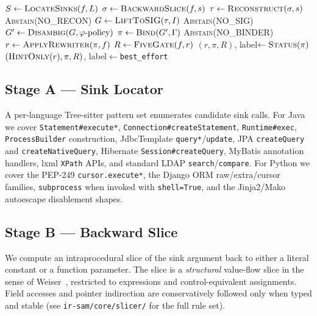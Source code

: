 \documentclass[conference]{IEEEtran}
\newcommand{\IRSAM}{\textsc{IR-SAM}}
\newcommand{\phisig}{\ensuremath{\varphi}}
\begin{document}
\begin{algorithm}[t]
\caption{\IRSAM{} top-level pipeline}\label{alg:pipeline}
\begin{algorithmic}[1]
  \State $S \gets \Call{LocateSinks}{f, L}$                      
    \State $\sigma \gets \Call{BackwardSlice}{f, s}$            
    \State $\tau \gets \Call{Reconstruct}{\sigma, s}$           
    \If{$\tau = \bot$} \State \Return \textsc{Abstain}(NO\_RECON)
    \EndIf
    \State $G \gets \Call{LiftToSIG}{\tau, I}$                  
     \State \Return \textsc{Abstain}(NO\_SIG)
    \EndIf
    \State $G' \gets \Call{Disambig}{G, \phisig\text{-policy}}$ 
    \State $\pi \gets \Call{Bind}{G', \Gamma}$                  
    \If{$\pi = \bot$} \State \Return \textsc{Abstain}(NO\_BINDER)
    \EndIf
    \State $r \gets \Call{ApplyRewriter}{\pi, f}$
    \State $R \gets \Call{FiveGate}{f, r}$                      
      \State \Return $(r, \pi, R)$, label$\gets\Call{Status}{\pi}$
    \Else
      \State \Return $(\textsc{HintOnly}(r), \pi, R)$, label$\gets$\texttt{best\_effort}
    \EndIf
  \EndFor
\EndFunction
\end{algorithmic}
\end{algorithm}

\subsection{Stage A --- Sink Locator}
A per-language Tree-sitter pattern set enumerates candidate sink
calls. For Java we cover \texttt{Statement\#execute*},
\texttt{Connection\#createStatement}, \texttt{Runtime\#exec},
\texttt{ProcessBuilder} construction, JdbcTemplate
\texttt{query*}/\texttt{update}, JPA \texttt{createQuery} and
\texttt{createNativeQuery}, Hibernate \texttt{Session\#createQuery},
MyBatis annotation handlers, lxml \texttt{XPath} APIs, and standard
LDAP \texttt{search}/\texttt{compare}. For Python we cover the
PEP-249 \texttt{cursor.execute*}, the Django ORM raw/extra/cursor
families, \texttt{subprocess} when invoked with
\texttt{shell=True}, and the Jinja2/Mako autoescape disablement
shapes.

\subsection{Stage B --- Backward Slice}
We compute an intraprocedural slice of the sink argument back to
either a literal constant or a function parameter. The slice is a
\emph{structural} value-flow slice in the sense of
Weiser~\cite{weiser_slicing_1981}, restricted to expressions and
control-equivalent assignments. Field accesses and pointer
indirection are conservatively followed only when typed and stable
(see \texttt{ir-sam/core/slicer/} for the full rule set).
\end{document}

